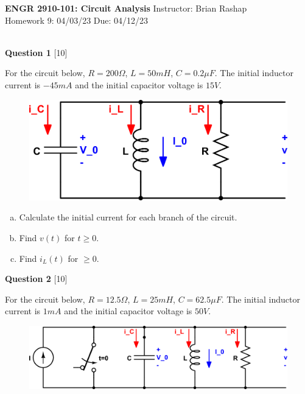 \documentclass[12pt]{article}
\begin{document}
\begin{center}
\hfil
{\large\bf {ENGR 2910-101: Circuit Analysis}}
\hfill Instructor: Brian Rashap\\
Homework 9: 04/03/23 \hfill Due: 04/12/23\\
\hrulefill\\
\end{center}

{\bf Question 1} [10] %

For the circuit below, $R = 200 \Omega$, $L = 50 mH$, $C=0.2\mu F$. The initial inductor current is $-45mA$ and the initial capacitor voltage is $15V$. 

\begin{figure}[h!]
\begin{center}
 \includegraphics[scale=0.4]{fig8_1.png}
\end{center}
\end{figure}

\begin{enumerate}[(a)]
\item Calculate the initial current for each branch of the circuit.
\item Find $v(t)$ for $t \geq 0$.
\item Find $i_L(t)$ for $ \geq 0$.
\end{enumerate}


\vspace{0.1in}


{\bf Question 2} [10] %

For the circuit below, $R = 12.5 \Omega$, $L = 25 mH$, $C=62.5\mu F$. The initial inductor current is $1 mA$ and the initial capacitor voltage is $50 V$. 

\begin{figure}[h!]
\begin{center}
 \includegraphics[scale=0.6]{fig8_2.png}
\end{center}
\end{figure}
\end{document}
